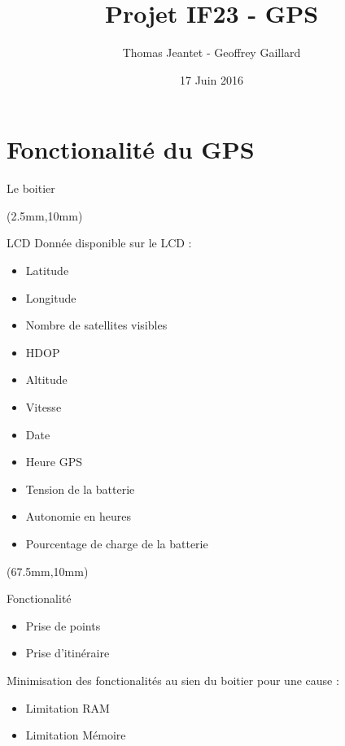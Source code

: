 \documentclass[10pt]{beamer}
\title{Projet IF23 - GPS}
\date{17 Juin 2016}
\author{Thomas Jeantet - Geoffrey Gaillard}
\institute{Université de Technologie de Troyes}
\begin{document}
	\maketitle
	\section{Fonctionalité du GPS}
	\begin{frame}{Le boitier}

		\begin{textblock*}{80mm}(2.5mm,10mm)
			\begin{block}{LCD}
			Donnée disponible sur le LCD :
			\begin{itemize}
				\item Latitude
				\item Longitude
				\item Nombre de satellites visibles
				\item HDOP
				\item Altitude
				\item Vitesse
				\item Date
				\item Heure GPS
				\item Tension de la batterie
				\item Autonomie en heures
				\item Pourcentage de charge de la batterie
			\end{itemize}
			\end{block}
		\end{textblock*}
		
		\begin{textblock*}{60mm}(67.5mm,10mm)
			\begin{block}{Fonctionalité}
			\begin{itemize}
				\item Prise de points
				\item Prise d'itinéraire
			\end{itemize}
			Minimisation des fonctionalités au sien du boitier pour une cause :
			\begin{itemize}
				\item Limitation RAM
				\item Limitation Mémoire
			\end{itemize}
			\end{block}
		\end{textblock*}
	\end{frame}
\end{document}
